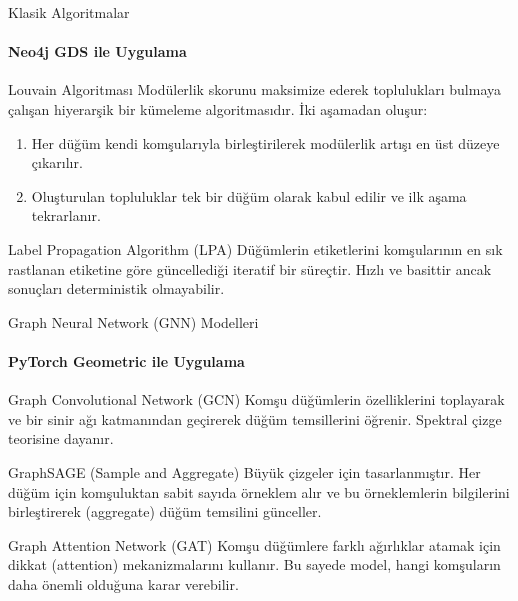 \documentclass{beamer}
\begin{document}
\begin{frame}{Klasik Algoritmalar}
    \framesubtitle{Neo4j GDS ile Uygulama}
    \begin{block}{Louvain Algoritması}
        Modülerlik skorunu maksimize ederek toplulukları bulmaya çalışan hiyerarşik bir kümeleme algoritmasıdır. İki aşamadan oluşur:
        \begin{enumerate}
            \item Her düğüm kendi komşularıyla birleştirilerek modülerlik artışı en üst düzeye çıkarılır.
            \item Oluşturulan topluluklar tek bir düğüm olarak kabul edilir ve ilk aşama tekrarlanır.
        \end{enumerate}
    \end{block}
    \begin{block}{Label Propagation Algorithm (LPA)}
        Düğümlerin etiketlerini komşularının en sık rastlanan etiketine göre güncellediği iteratif bir süreçtir. Hızlı ve basittir ancak sonuçları deterministik olmayabilir.
    \end{block}
\end{frame}

\begin{frame}{Graph Neural Network (GNN) Modelleri}
    \framesubtitle{PyTorch Geometric ile Uygulama}
    \begin{block}{Graph Convolutional Network (GCN)}
        Komşu düğümlerin özelliklerini toplayarak ve bir sinir ağı katmanından geçirerek düğüm temsillerini öğrenir. Spektral çizge teorisine dayanır.
    \end{block}
    \begin{block}{GraphSAGE (Sample and Aggregate)}
        Büyük çizgeler için tasarlanmıştır. Her düğüm için komşuluktan sabit sayıda örneklem alır ve bu örneklemlerin bilgilerini birleştirerek (aggregate) düğüm temsilini günceller.
    \end{block}
    \begin{block}{Graph Attention Network (GAT)}
        Komşu düğümlere farklı ağırlıklar atamak için dikkat (attention) mekanizmalarını kullanır. Bu sayede model, hangi komşuların daha önemli olduğuna karar verebilir.
    \end{block}
\end{frame}
\end{document}
